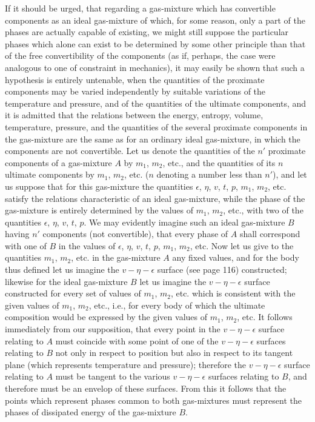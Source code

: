 \documentclass[12pt]{article}
\begin{document}
If it should be urged, that regarding a gas-mixture which has convertible components as an ideal gas-mixture of which, for some reason, only a part of the phases are actually capable of existing, we might still suppose the particular phases which alone can exist to be determined by some other principle than that of the free convertibility of the components (as if, perhaps, the case were analogous to one of constraint in mechanics), it may easily be shown that such a hypothesis is entirely untenable, when the quantities of the proximate components may be varied independently by suitable variations of the temperature and pressure, and of the quantities of the ultimate components, and it is admitted that the relations between the energy, entropy, volume, temperature, pressure, and the quantities of the several proximate components in the gas-mixture are the same as for an ordinary ideal gas-mixture, in which the components are not convertible. Let us denote the quantities of the $n'$ proximate components of a gas-mixture $A$ by $m_1$, $m_2$, etc., and the quantities of its $n$ ultimate components by $m_1$, $m_2$, etc. ($n$ denoting a number less than $n'$), and let us suppose that for this gas-mixture the quantities $\epsilon$, $\eta$, $v$, $t$, $p$, $m_1$, $m_2$, etc. satisfy the relations characteristic of an ideal gas-mixture, while the phase of the gas-mixture is entirely determined by the values of $m_1$, $m_2$, etc., with two of the quantities $\epsilon$, $\eta$, $v$, $t$, $p$. We may evidently imagine such an ideal gas-mixture $B$ having $n'$ components (not convertible), that every phase of $A$ shall correspond with one of $B$ in the values of $\epsilon$, $\eta$, $v$, $t$, $p$, $m_1$, $m_2$, etc. Now let us give to the quantities $m_1$, $m_2$, etc. in the gas-mixture $A$ any fixed values, and for the body thus defined let us imagine the $v\!-\eta\!-\epsilon$ surface (see page 116) constructed; likewise for the ideal gas-mixture $B$ let us imagine the $v\!-\eta\!-\epsilon$ surface constructed for every set of values of $m_1$, $m_2$, etc. which is consistent with the given values of $m_1$, $m_2$, etc., i.e., for every body of which the ultimate composition would be expressed by the given values of $m_1$, $m_2$, etc. It follows immediately from our supposition, that every point in the $v\!-\eta\!-\epsilon$ surface relating to $A$ must coincide with some point of one of the $v\!-\eta\!-\epsilon$ surfaces relating to $B$ not only in respect to position but also in respect to its tangent plane (which represents temperature and pressure); therefore the $v\!-\eta\!-\epsilon$ surface relating to $A$ must be tangent to the various $v\!-\eta\!-\epsilon$ surfaces relating to $B$, and therefore must be an envelop of these surfaces. From this it follows that the points which represent phases common to both gas-mixtures must represent the phases of dissipated energy of the gas-mixture $B$.
\end{document}
